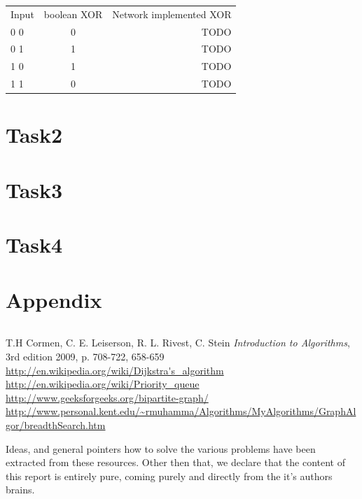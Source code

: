 \documentclass[a4paper]{article}
\begin{document}
\begin{center}
    \begin{tabular} {l | c | r }
        Input & boolean XOR & Network implemented XOR \\
        0 0 & 0 & TODO \\
        0 1 & 1 & TODO \\
        1 0 & 1 & TODO \\
        1 1 & 0 & TODO \\
    \end{tabular}
\end{center}

\section{Task2}
\section{Task3}
\section{Task4}
\section{Appendix}

\begin{lstlisting}
\end{lstlisting}

\begin{thebibliography}{9}
		T.H Cormen, C. E. Leiserson, R. L. Rivest, C. Stein 	
				\textit{Introduction to Algorithms}, 3rd edition 2009, p. 708-722, 658-659 \\
		\url{http://en.wikipedia.org/wiki/Dijkstra's\_algorithm} \\
		\url{http://en.wikipedia.org/wiki/Priority\_queue} \\
		\url{http://www.geeksforgeeks.org/bipartite-graph/}
		\url{http://www.personal.kent.edu/~rmuhamma/Algorithms/MyAlgorithms/GraphAlgor/breadthSearch.htm}
\end{thebibliography}

Ideas, and general pointers how to solve the various problems have been extracted from these resources. Other then that, we declare that the content of this report is entirely pure, coming purely and directly from the it's authors brains.  
\end{document}
